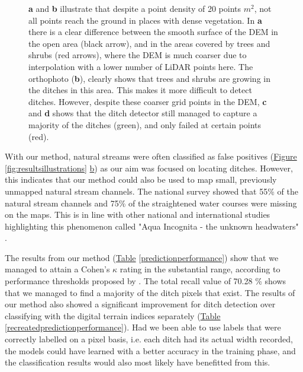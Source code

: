 \documentclass[11pt, review]{elsarticle} %
\begin{document}
\begin{figure}[H]
    \caption{\textbf{a} and \textbf{b} illustrate that despite a point density of 20 points $m^2$, not all points reach the ground in places with dense vegetation. In \textbf{a} there is a clear difference between the smooth surface of the DEM in the open area (black arrow), and in the areas covered by trees and shrubs (red arrows), where the DEM is much coarser due to interpolation with a lower number of LiDAR points here. The orthophoto (\textbf{b}), clearly shows that trees and shrubs are growing in the ditches in this area. This makes it more difficult to detect ditches. However, despite these coarser grid points in the DEM, \textbf{c} and \textbf{d} shows that the ditch detector still managed to capture a majority of the ditches (green), and only failed at certain points (red).}
    \label{fig:resultstreesbushes}
\end{figure}

With our method, natural streams were often classified as false positives (\hyperref[fig:resultsillustrations]{Figure} \ref{fig:resultsillustrations} \hyperref[fig:resultsillustrations]{b}) as our aim was focused on locating ditches. However, this indicates that our method could also be used to map small, previously unmapped natural stream channels. The national survey showed that 55\% of the natural stream channels and 75\% of the straightened water courses were missing on the maps. This is in line with other national \citep{kuglerova} and international \citep{benstead} studies highlighting this phenomenon called "Aqua Incognita - the unknown headwaters" \citep{bishop,kuglerova}.

The results from our method (\hyperref[predictionperformance]{Table} \ref{predictionperformance}) show that we managed to attain a Cohen's $\kappa$ rating in the substantial range, according to performance thresholds proposed by \citet{kappaanalysis}. The total recall value of 70.28 \% shows that we managed to find a majority of the ditch pixels that exist. The results of our method also showed a significant improvement for ditch detection over classifying with the digital terrain indices separately (\hyperref[recreatedpredictionperformance]{Table} \ref{recreatedpredictionperformance}). Had we been able to use labels that were correctly labelled on a pixel basis, i.e. each ditch had its actual width recorded, the models could have learned with a better accuracy in the training phase, and the classification results would also most likely have benefitted from this.
\end{document}
